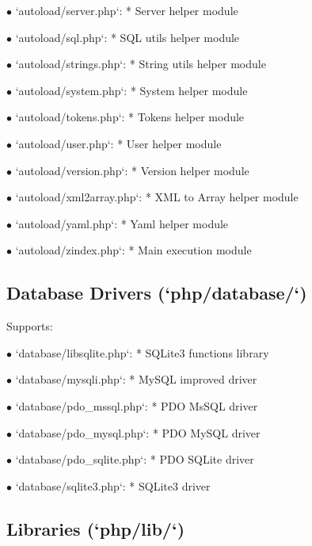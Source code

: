 \documentclass[a4paper]{article}
\begin{document}
\begin{compactitem}
\item[\color{myblue}$\bullet$] `autoload/server.php`: * Server helper module
\item[\color{myblue}$\bullet$] `autoload/sql.php`: * SQL utils helper module
\item[\color{myblue}$\bullet$] `autoload/strings.php`: * String utils helper module
\item[\color{myblue}$\bullet$] `autoload/system.php`: * System helper module
\item[\color{myblue}$\bullet$] `autoload/tokens.php`: * Tokens helper module
\item[\color{myblue}$\bullet$] `autoload/user.php`: * User helper module
\item[\color{myblue}$\bullet$] `autoload/version.php`: * Version helper module
\item[\color{myblue}$\bullet$] `autoload/xml2array.php`: * XML to Array helper module
\item[\color{myblue}$\bullet$] `autoload/yaml.php`: * Yaml helper module
\item[\color{myblue}$\bullet$] `autoload/zindex.php`: * Main execution module
\end{compactitem}

\hypertarget{toc8}{}
\subsection{Database Drivers (`php/database/`)}

Supports:

\begin{compactitem}
\item[\color{myblue}$\bullet$] `database/libsqlite.php`: * SQLite3 functions library
\item[\color{myblue}$\bullet$] `database/mysqli.php`: * MySQL improved driver
\item[\color{myblue}$\bullet$] `database/pdo\_mssql.php`: * PDO MsSQL driver
\item[\color{myblue}$\bullet$] `database/pdo\_mysql.php`: * PDO MySQL driver
\item[\color{myblue}$\bullet$] `database/pdo\_sqlite.php`: * PDO SQLite driver
\item[\color{myblue}$\bullet$] `database/sqlite3.php`: * SQLite3 driver
\end{compactitem}

\hypertarget{toc9}{}
\subsection{Libraries (`php/lib/`)}
\end{document}
